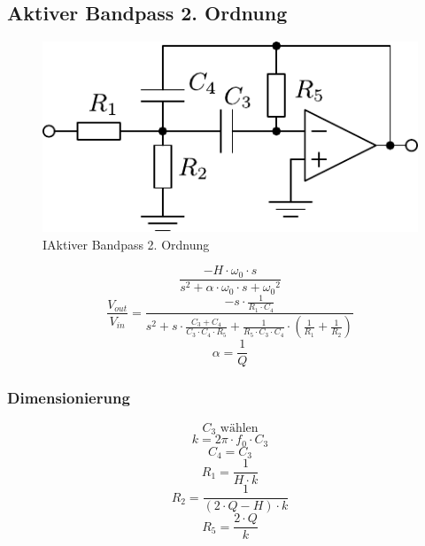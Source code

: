



\subsection{Aktiver Bandpass 2. Ordnung}
\begin{figure}[h!]
	\centering
	\includegraphics[scale=\schscale]{op_bp_o2.pdf}
	\caption{IAktiver Bandpass 2. Ordnung}
	\label{sch:op-bp-o2}
\end{figure}
\[ \frac{- H \cdot \omega_0 \cdot s}
{s^2 + \alpha \cdot \omega_0 \cdot s  + {\omega_0}^2} \]
\[ \frac{V_{out}}{V_{in}} = \frac{- s \cdot \frac{1}{R_1 \cdot C_4}}
{s^2 + s \cdot \frac{C_3 + C_4}{C_3 \cdot C_4 \cdot R_5} + 
\frac{1}{R_5 \cdot C_3 \cdot C_4} \cdot 
\left(\frac{1}{R_1} + \frac{1}{R_2}\right)} \]
\[  \alpha = \frac{1}{Q}\]
\subsubsection{Dimensionierung}
\[ C_3 \text{ wählen} \]
\[ k = 2 \pi \cdot f_0 \cdot C_3 \]
\[ C_4 = C_3 \]
\[ R_1 = \frac{1}{H \cdot k} \]
\[ R_2 = \frac{1}{(2 \cdot Q - H) \cdot k} \]
\[ R_5 = \frac{2 \cdot Q}{k} \]